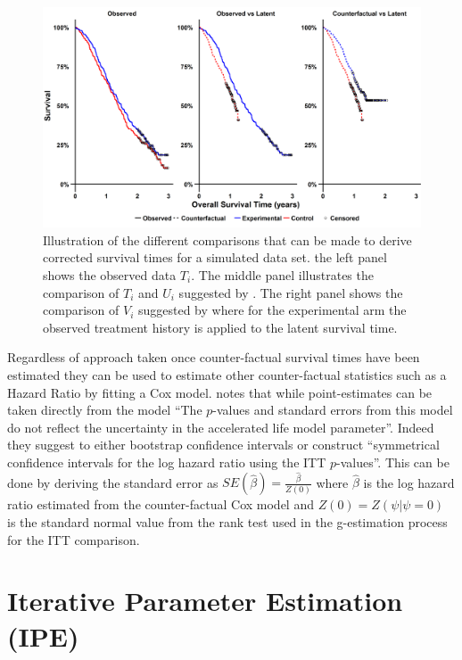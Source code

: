 \begin{figure}[ht]
\centering
\includegraphics[width=15cm]{images/chap_methrev/example_cfact.png}
\caption{\label{F:methrev:excfact} Illustration of the different comparisons that can be made to derive corrected survival times for a simulated data set. the left panel shows the observed data $T_i$. The middle panel illustrates the comparison of $T_i$ and $U_i$ suggested by \cite{Latimer2014}. The right panel shows the comparison of $V_i$ suggested by \cite{Robins1991} where for the experimental arm the observed treatment history is applied to the latent survival time.} 
\end{figure}





Regardless of approach taken once counter-factual survival times have been estimated they can be used to estimate other counter-factual statistics such as a Hazard Ratio by fitting a Cox model. \cite{White1999} notes that while point-estimates can be taken directly from the model ``The $p$-values and standard errors from this model do not reflect the uncertainty in the accelerated life model parameter''. Indeed they suggest to either bootstrap confidence intervals or construct ``symmetrical confidence intervals for the log hazard ratio using the ITT $p$-values''. This can be done by deriving the standard error as $SE(\hat{\beta}) = \frac{\hat{\beta}}{Z(0)}$ where $\hat{\beta}$ is the log hazard ratio estimated from the counter-factual Cox model and $Z(0)=Z(\psi|\psi=0)$ is the standard normal value from the rank test used in the g-estimation process for the ITT comparison.




\section{Iterative Parameter Estimation (IPE)}


